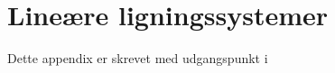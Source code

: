 \chapter{Lineære ligningssystemer}\label{afsnit:linlign}
Dette appendix er skrevet med udgangspunkt i \citep{lial}



